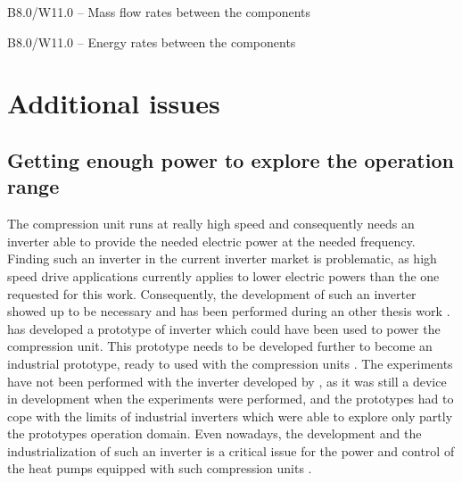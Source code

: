 \begin{table}[htbp]
    \footnotesize
    \begin{center}
      
    \end{center}
    \caption{B8.0/W11.0 -- Mass flow rates between the components}
    \label{tab:bwp-B8.0/W11.0-mf}
\end{table}

\begin{table}[htbp]
    \footnotesize
    \begin{center}
    
  \end{center}
  \caption{B8.0/W11.0 -- Energy rates between the components}
  \label{tab:B8.0/W11.0-energy-flows}
\end{table}

\section{Additional issues}
\label{sec:bwp-issues}

\subsection{Getting enough power to explore the operation range}
\label{sec:bwp-issue-power}

The compression unit runs at really high speed and consequently needs
an inverter able to provide the needed electric power at the needed
frequency. Finding such an inverter in the current inverter market is
problematic, as high speed drive applications currently applies to
lower electric powers than the one requested for this
work. Consequently, the development of such an inverter
showed up to be necessary and has been performed during an other
thesis work \citep{rod-2012a}. \citet[fig. 6.6, p.\,118]{rod-2012a} has
developed a prototype of inverter which could have been used to power
the compression unit. This prototype needs to be developed further to
become an industrial prototype, ready to used with the compression
units \citep[p.\,134]{rod-2012a}. The experiments have not been
performed with the inverter developed by \citep{rod-2012a}, as it was
still a device in development when the experiments were performed, and
the prototypes had to cope with the limits of industrial inverters
which were able to explore only partly the prototypes operation
domain. Even nowadays, the development and the industrialization of
such an inverter is a critical issue for the power and control of the
heat pumps equipped with such compression
units \citep[p.\,135]{rod-2012a}.

